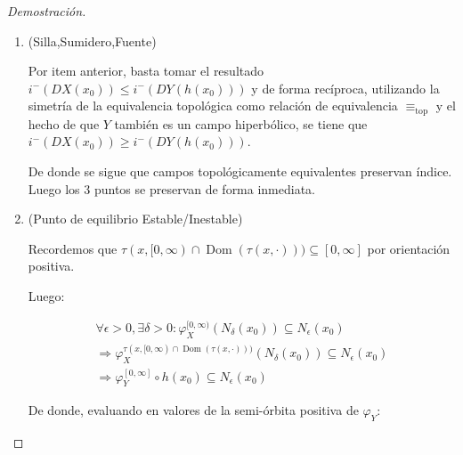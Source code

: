 \begin{proof}[Demostración]
\begin{enumerate}
		De manera análoga en $-X$:  
		
		\begin{align*}
			i^{+}(DX(x_0)) \leq i^{+}(DY(h(x_0))) &\Rightarrow \dim \mathbb{R}^n - i^{-}(DX(x_0)) \leq i^{+}(DY(h(x_0))) \\
			&\Rightarrow \dim \mathbb{R}^n - i^{+}(DY(h(x_0))) \leq i^{-}(DX(x_0)) \leq  i^{-}(DY(h(x_0)))\\
			&\Rightarrow \dim \mathbb{R}^n \leq i^{+}(DY(h(x_0))) +  i^{-}(DY(h(x_0)))\\
			 \, \ \, &= i^{\pm}(DY(h(x_0))) \leq \dim \mathbb{R}^n \\
			&\Rightarrow  i^{\pm}(DY(h(x_0))) = \dim \mathbb{R}^n \\
			&\Rightarrow  i^{0}(DY(h(x_0))) = 0 \\
		\end{align*}
		
		
		\item (Silla,Sumidero,Fuente)
		
		Por item anterior, basta tomar el resultado $i^{-}(DX(x_0)) \leq i^{-}(DY(h(x_0)))$ y de forma recíproca, utilizando la simetría de la equivalencia topológica como relación de equivalencia $\equiv_{\text{top}}$ y el hecho de que $Y$ también es un campo hiperbólico, se tiene que $i^{-}(DX(x_0)) \geq i^{-}(DY(h(x_0)))$.  
		
		De donde se sigue que campos topológicamente equivalentes preservan índice. Luego los 3 puntos se preservan de forma inmediata.
		
		
		\item (Punto de equilibrio Estable/Inestable)
		
		Recordemos que $\tau(x,[0,\infty) \cap \operatorname{Dom}(\tau(x,\cdot)) ) \subseteq [0,\infty]$ por orientación positiva.
		
		Luego:
		
		
		\begin{gather*}
			\forall \epsilon >0, \exists \delta >0 :\varphi^{[0,\infty)}_X(N_{\delta}(x_0)) \subseteq N_{\epsilon}(x_0)\\
			\Rightarrow \varphi^{\tau(x,[0,\infty) \cap \operatorname{Dom}(\tau(x,\cdot)) )}_X(N_{\delta}(x_0)) \subseteq N_{\epsilon}(x_0)\\
			\Rightarrow \varphi_Y^{[0,\infty]} \circ h(x_0) \subseteq N_{\epsilon}(x_0)
		\end{gather*}
		
		De donde, evaluando en valores de la semi-órbita positiva de $\varphi_Y$:
		

\end{enumerate}
\end{proof}
